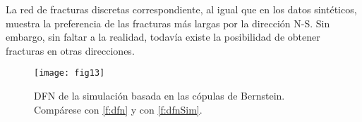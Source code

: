 La red de fracturas discretas correspondiente, al igual que en los datos sint\'eticos, muestra la preferencia de las fracturas m\'as largas por la direcci\'on N-S. Sin embargo, sin faltar a la realidad, todav\'ia existe la posibilidad de obtener fracturas en otras direcciones.

\begin{figure}[H]
	\centering
	\texttt{[image: fig13]}
	\caption{DFN de la simulaci\'on basada en las c\'opulas de Bernstein. Comp\'arese con \autoref{f:dfn} y con \autoref{f:dfnSim}.}
	\label{f:dfnSim}
\end{figure}

